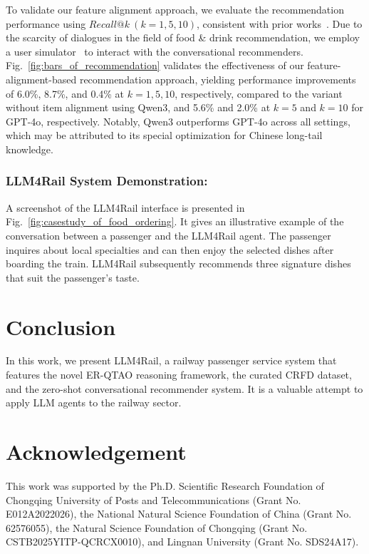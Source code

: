\documentclass[runningheads]{llncs}
\begin{document}
To validate our feature alignment approach, we evaluate the recommendation performance using $Recall@k \ (k=1, 5, 10)$, consistent with prior works~\cite{zeroshot-crs,unleashing-crs}.
Due to the scarcity of dialogues in the field of food \& drink recommendation, we employ a user simulator~\cite{rethink-crs,usb-rec} to interact with the conversational recommenders. 
Fig.~\ref{fig:bars_of_recommendation} validates the effectiveness of our feature-alignment-based recommendation approach, yielding performance improvements of 6.0\%, 8.7\%, and 0.4\% at $k = 1, 5, 10$, respectively, compared to the variant without item alignment using Qwen3, and 5.6\% and 2.0\% at $k = 5$  and $k = 10$ for GPT-4o, respectively.
Notably, Qwen3 outperforms GPT-4o across all settings, which may be attributed to its special optimization for Chinese long-tail knowledge.



\subsubsection{LLM4Rail System Demonstration:}
A screenshot of the LLM4Rail interface is presented in Fig.~\ref{fig:casestudy_of_food_ordering}.
It gives an illustrative example of the conversation between a passenger and the LLM4Rail agent.
The passenger inquires about local specialties and can then enjoy the selected dishes after boarding the train. 
LLM4Rail subsequently recommends three signature dishes that suit the passenger's taste.







\section{Conclusion}
In this work, we present LLM4Rail, a railway passenger service system that features the novel ER-QTAO reasoning framework, the curated CRFD dataset, and the zero-shot conversational recommender system.
It is a valuable attempt to apply LLM agents to the railway sector.







\section{Acknowledgement}
This work was supported by the Ph.D. Scientific Research Foundation of Chongqing University of Posts and Telecommunications (Grant No. E012A2022026), the National Natural Science Foundation of China (Grant No. 62576055), the Natural Science Foundation of Chongqing (Grant No. CSTB2025YITP-QCRCX0010), and Lingnan University (Grant No. SDS24A17).
\end{document}
